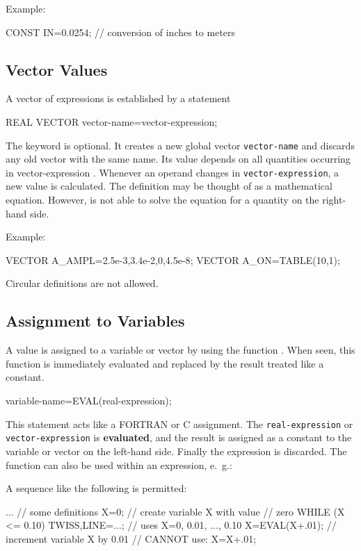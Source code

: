 \noindent Example:
\begin{example}
CONST IN=0.0254; // conversion of inches to meters
\end{example}

\subsection{Vector Values}
\label{sec:vector}
A vector of expressions is established by a statement
\begin{example}
REAL VECTOR vector-name=vector-expression;
\end{example}
The keyword  is optional.
It creates a new global vector \texttt{vector-name}
and discards any old vector with the same name.
Its value depends on all quantities occurring in
{vector-expression} .
Whenever an operand changes in \texttt{vector-expression},
a new value is calculated.
The definition may be thought of as a mathematical equation.
However, \opal is not able to solve the equation for a quantity on the
right-hand side.

\noindent Example:
\begin{example}
VECTOR A_AMPL={2.5e-3,3.4e-2,0,4.5e-8};
VECTOR A_ON=TABLE(10,1);
\end{example}
Circular definitions are not allowed.

\subsection{Assignment to Variables}
\label{sec:eval}
A value is assigned to a variable or vector by using the function
.
When seen, this function is immediately evaluated and replaced by the
result treated like a constant.
\begin{example}
variable-name=EVAL(real-expression);
\end{example}
This statement acts like a FORTRAN or C assignment.
The \texttt{real-expression} or \texttt{vector-expression} is
\textbf{evaluated},
and the result is assigned as a constant to the variable or vector on
the left-hand side.
Finally the expression is discarded.
The  function can also be used within an expression, e.~g.:
\begin{example}
vector-name=TABLE(range,EVAL(real-expression));
vector-name={...,EVAL(real-expression),...);
\end{example}
A sequence like the following is permitted:
\begin{example}
...                 // some definitions
X=0;                // create variable X with value
                    // zero
WHILE (X <= 0.10) {
  TWISS,LINE=...;   // uses X=0, 0.01, ..., 0.10
  X=EVAL(X+.01);    // increment variable X by 0.01
                    // CANNOT use: X=X+.01;
}
\end{example}

